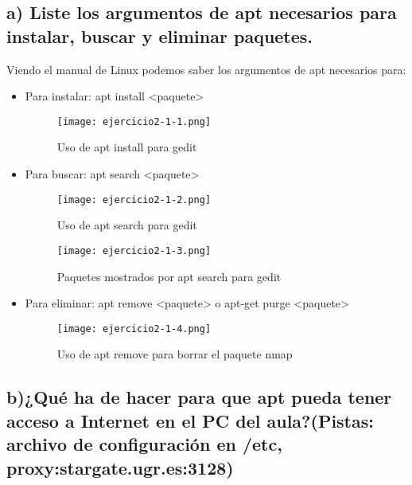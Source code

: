 	
	\subsection{a) Liste los argumentos de apt necesarios para instalar, buscar y eliminar paquetes.}
	
	Viendo el manual de Linux\cite{ejercicio2-1} podemos saber los argumentos de apt necesarios para:
	
	\begin{itemize}
		\item Para instalar: apt install <paquete>
			\begin{figure}[H] 
				\centering
				\texttt{[image: ejercicio2-1-1.png]} 
				\label{figura12} 
				
				\caption{Uso de apt install para gedit}
			\end{figure}
		 
		\item Para buscar: apt search <paquete>
			\begin{figure}[H] 
				\centering
				\texttt{[image: ejercicio2-1-2.png]} 
				\label{figura13} 
				
				\caption{Uso de apt search para gedit}
			\end{figure}
			\begin{figure}[H] 
				\centering
				\texttt{[image: ejercicio2-1-3.png]} 
				\label{figura14} 
				
				\caption{Paquetes mostrados por apt search para gedit}
			\end{figure}
		\item Para eliminar: apt remove <paquete>  o apt-get purge <paquete>
			\begin{figure}[H] 
				\centering
				\texttt{[image: ejercicio2-1-4.png]} 
				\label{figura15} 
				
				\caption{Uso de apt remove para borrar el paquete nmap}
			\end{figure}
	\end{itemize}
	
	\subsection{b)¿Qué ha de hacer para que apt pueda tener acceso a Internet en el PC del aula?(Pistas: archivo de configuración en /etc, proxy:stargate.ugr.es:3128)}
	
